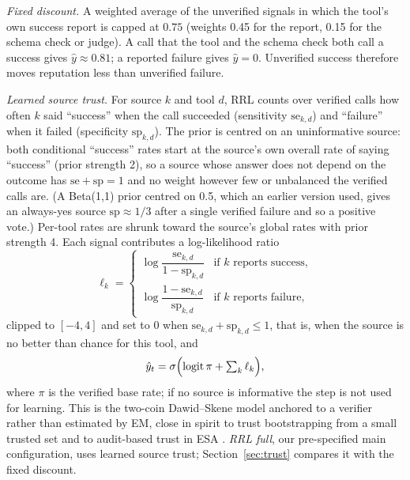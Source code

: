 \documentclass[11pt]{article}
\begin{document}
\emph{Fixed discount.} A weighted average of the unverified signals in which the tool's own
success report is capped at $0.75$ (weights 0.45 for the report, 0.15 for the schema check or
judge). A call that the tool and the schema check both call a success gives $\hat y\approx0.81$;
a reported failure gives $\hat y=0$. Unverified success therefore moves reputation less than
unverified failure.

\emph{Learned source trust.} For source $k$ and tool $d$, RRL counts over verified calls how
often $k$ said ``success'' when the call succeeded (sensitivity $\mathrm{se}_{k,d}$) and
``failure'' when it failed (specificity $\mathrm{sp}_{k,d}$). The prior is centred on an
uninformative source: both conditional ``success'' rates start at the source's own overall
rate of saying ``success'' (prior strength 2), so a source whose answer does not depend on the
outcome has $\mathrm{se}+\mathrm{sp}=1$ and no weight however few or unbalanced the verified
calls are. (A Beta(1,1) prior centred on 0.5, which an earlier version used, gives an
always-yes source $\mathrm{sp}\approx1/3$ after a single verified failure and so a positive
vote.) Per-tool rates are shrunk toward the source's global rates with prior strength 4. Each signal
contributes a log-likelihood ratio
\begin{equation}
  \ell_k = \begin{cases}
    \log\dfrac{\mathrm{se}_{k,d}}{1-\mathrm{sp}_{k,d}} & \text{if } k \text{ reports success},\\[2ex]
    \log\dfrac{1-\mathrm{se}_{k,d}}{\mathrm{sp}_{k,d}} & \text{if } k \text{ reports failure},
  \end{cases}
\end{equation}
clipped to $[-4,4]$ and set to $0$ when $\mathrm{se}_{k,d}+\mathrm{sp}_{k,d}\le 1$, that is, when
the source is no better than chance for this tool, and
\begin{equation}
  \hat y_t = \sigma\Bigl(\operatorname{logit}\pi + \textstyle\sum_k \ell_k\Bigr),
\end{equation}
where $\pi$ is the verified base rate; if no source is informative the step is not used for
learning. This is the two-coin Dawid--Skene model \citep{dawid1979,whitehill2009} anchored to a
verifier rather than estimated by EM, close in spirit to trust bootstrapping from a small trusted
set \citep{fltrust} and to audit-based trust in ESA \citep{esa}. \emph{RRL full}, our
pre-specified main configuration, uses learned source trust; Section~\ref{sec:trust} compares it
with the fixed discount.
\end{document}
